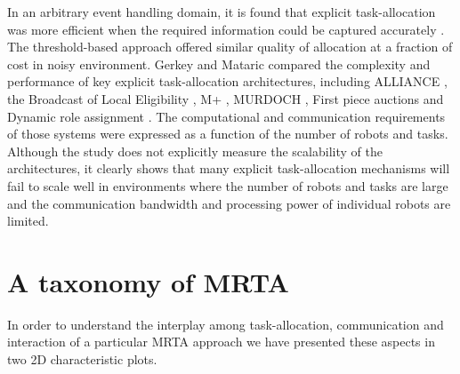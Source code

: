 \documentclass[journal]{IEEEtran}
\begin{document}
In an arbitrary event handling domain, it is found that explicit task-allocation was more efficient when the required information could be captured accurately \cite{kalra+2007}.  The threshold-based approach offered similar quality of allocation at a fraction of cost in noisy environment.  
Gerkey and Mataric \cite{Gerkey+2003} compared the complexity and performance of key explicit task-allocation architectures, including ALLIANCE \cite{Parker1998}, the Broadcast of Local Eligibility \cite{Werger2001}, M+ \cite{Botelho+1999}, MURDOCH \cite{Gerkey+2002}, First piece auctions \cite{Zlot+2002} and Dynamic role assignment \cite{Chaimowicz2002}.  The computational and communication requirements of those systems were expressed as a function of the number of robots and tasks.  Although the study does not explicitly measure the scalability of the architectures, it clearly shows that many explicit task-allocation mechanisms will fail to scale well in environments where the number of robots and tasks are large and the  communication bandwidth and processing power of individual robots are limited.
\section{A taxonomy of MRTA}
\label{sec:taxonomy}
In order to understand the interplay among task-allocation, communication and interaction of a particular MRTA approach we have presented these aspects in two 2D characteristic plots.  %
\end{document}
